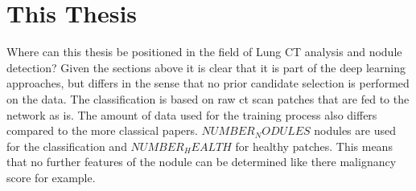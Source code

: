 \documentclass[main.tex]{subfiles}
\begin{document}
\section{This Thesis}
Where can this thesis be positioned in the field of Lung CT analysis and nodule detection? Given the sections above it is clear that it is part of the deep learning approaches, but differs in the sense that no prior candidate selection is performed on the data. The classification is based on raw ct scan patches that are fed to the network as is. The amount of data used for the training process also differs compared to the more classical papers. $NUMBER_NODULES$ nodules are used for the classification and $NUMBER_HEALTH$ for healthy patches. This means that no further features of the nodule can be determined like there malignancy score for example.
\end{document}
